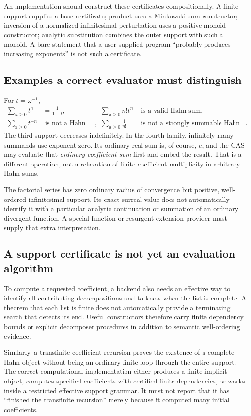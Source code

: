 \documentclass[11pt,letterpaper]{article}
\theoremstyle{definition}
\numberwithin{equation}{section}
\begin{document}
An implementation should construct these certificates compositionally. A finite support supplies a base certificate; product uses a Minkowski-sum constructor; inversion of a normalized infinitesimal perturbation uses a positive-monoid constructor; analytic substitution combines the outer support with such a monoid. A bare statement that a user-supplied program ``probably produces increasing exponents'' is not such a certificate.

\subsection{Examples a correct evaluator must distinguish}
For $t=\omega^{-1}$,
\begin{align*}
 \sum_{n\ge0}t^n&=\frac1{1-t}, &
 \sum_{n\ge0}n!t^n&\text{ is a valid Hahn sum},\\
 \sum_{n\ge0}t^{-n}&\text{ is not a Hahn sum}, &
 \sum_{n\ge0}\frac1{n!}&\text{ is not a strongly summable Hahn family}.
\end{align*}
The third support decreases indefinitely. In the fourth family, infinitely many summands use exponent zero. Its ordinary real sum is, of course, $e$, and the CAS may evaluate that \emph{ordinary coefficient sum} first and embed the result. That is a different operation, not a relaxation of finite coefficient multiplicity in arbitrary Hahn sums.

The factorial series has zero ordinary radius of convergence but positive, well-ordered infinitesimal support. Its exact surreal value does not automatically identify it with a particular analytic continuation or summation of an ordinary divergent function. A special-function or resurgent-extension provider must supply that extra interpretation.

\subsection{A support certificate is not yet an evaluation algorithm}
To compute a requested coefficient, a backend also needs an effective way to identify all contributing decompositions and to know when the list is complete. A theorem that each list is finite does not automatically provide a terminating search that detects its end. Useful constructors therefore carry finite dependency bounds or explicit decomposer procedures in addition to semantic well-ordering evidence.

Similarly, a transfinite coefficient recursion proves the existence of a complete Hahn object without being an ordinary finite loop through the entire support. The correct computational implementation either produces a finite implicit object, computes specified coefficients with certified finite dependencies, or works inside a restricted effective support grammar. It must not report that it has ``finished the transfinite recursion'' merely because it computed many initial coefficients.
\end{document}
